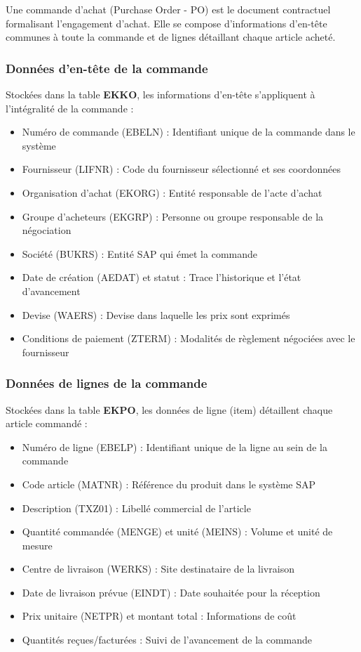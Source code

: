 \documentclass[12pt,a4paper,oneside]{report}
\begin{document}
Une commande d'achat (Purchase Order - PO) est le document contractuel formalisant l'engagement d'achat. 
Elle se compose d'informations d'en-tête communes à toute la commande et de lignes détaillant chaque article acheté.

\subsubsection{Données d'en-tête de la commande}\label{ch2:mm-po-entete}

Stockées dans la table \textbf{EKKO}, les informations d'en-tête s'appliquent à l'intégralité de la commande :

\begin{itemize}[label=---, itemsep=0.15em]
	\item Numéro de commande (EBELN) : Identifiant unique de la commande dans le système
	\item Fournisseur (LIFNR) : Code du fournisseur sélectionné et ses coordonnées
	\item Organisation d'achat (EKORG) : Entité responsable de l'acte d'achat
	\item Groupe d'acheteurs (EKGRP) : Personne ou groupe responsable de la négociation
	\item Société (BUKRS) : Entité SAP qui émet la commande
	\item Date de création (AEDAT) et statut : Trace l'historique et l'état d'avancement
	\item Devise (WAERS) : Devise dans laquelle les prix sont exprimés
	\item Conditions de paiement (ZTERM) : Modalités de règlement négociées avec le fournisseur
\end{itemize}

\subsubsection{Données de lignes de la commande}\label{ch2:mm-po-lignes}

Stockées dans la table \textbf{EKPO}, les données de ligne (item) détaillent chaque article commandé :

\begin{itemize}[label=\textbullet, itemsep=0.2em]
	\item Numéro de ligne (EBELP) : Identifiant unique de la ligne au sein de la commande
	\item Code article (MATNR) : Référence du produit dans le système SAP
	\item Description (TXZ01) : Libellé commercial de l'article
	\item Quantité commandée (MENGE) et unité (MEINS) : Volume et unité de mesure
	\item Centre de livraison (WERKS) : Site destinataire de la livraison
	\item Date de livraison prévue (EINDT) : Date souhaitée pour la réception
	\item Prix unitaire (NETPR) et montant total : Informations de coût
	\item Quantités reçues/facturées : Suivi de l'avancement de la commande
\end{itemize}
\end{document}
